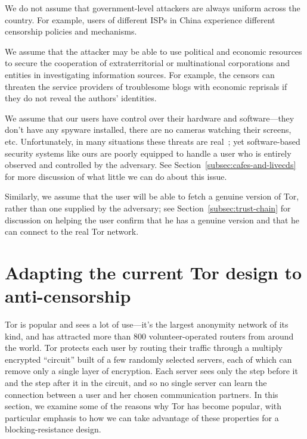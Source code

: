 \documentclass{llncs}
\begin{document}
We do not assume that government-level attackers are always uniform
across the country. For example, users of different ISPs in China
experience different censorship policies and mechanisms.

We assume that the attacker may be able to use political and economic
resources to secure the cooperation of extraterritorial or multinational
corporations and entities in investigating information sources.
For example, the censors can threaten the service providers of
troublesome blogs with economic reprisals if they do not reveal the
authors' identities.

We assume that our users have control over their hardware and
software---they don't have any spyware installed, there are no
cameras watching their screens, etc. Unfortunately, in many situations
these threats are real~\cite{zuckerman-threatmodels}; yet
software-based security systems like ours are poorly equipped to handle
a user who is entirely observed and controlled by the adversary. See
Section~\ref{subsec:cafes-and-livecds} for more discussion of what little
we can do about this issue.

Similarly, we assume that the user will be able to fetch a genuine
version of Tor, rather than one supplied by the adversary; see
Section~\ref{subsec:trust-chain} for discussion on helping the user
confirm that he has a genuine version and that he can connect to the
real Tor network.

\section{Adapting the current Tor design to anti-censorship}
\label{sec:current-tor}

Tor is popular and sees a lot of use---it's the largest anonymity
network of its kind, and has
attracted more than 800 volunteer-operated routers from around the
world.  Tor protects each user by routing their traffic through a multiply
encrypted ``circuit'' built of a few randomly selected servers, each of which
can remove only a single layer of encryption.  Each server sees only the step
before it and the step after it in the circuit, and so no single server can
learn the connection between a user and her chosen communication partners.
In this section, we examine some of the reasons why Tor has become popular,
with particular emphasis to how we can take advantage of these properties
for a blocking-resistance design.
\end{document}
